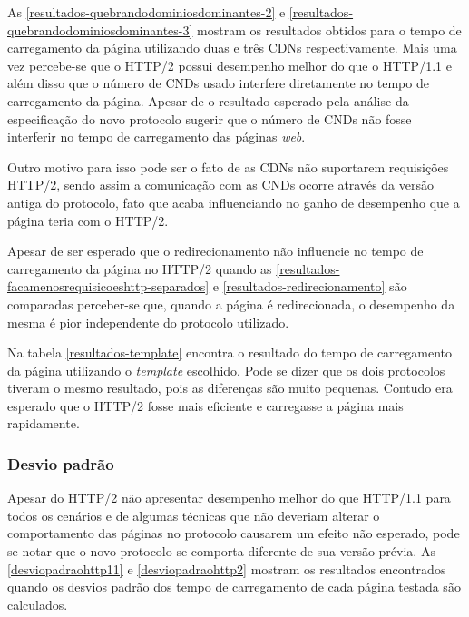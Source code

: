 



As \autoref{resultados-quebrandodominiosdominantes-2} e \autoref{resultados-quebrandodominiosdominantes-3} mostram os resultados obtidos para o tempo de carregamento da página utilizando duas e três CDNs respectivamente. Mais uma vez percebe-se que o HTTP/2 possui desempenho melhor do que o HTTP/1.1 e além disso que o número de CNDs usado interfere diretamente no tempo de carregamento da página. Apesar de o resultado esperado pela análise da especificação do novo protocolo sugerir que o número de CNDs não fosse interferir no tempo de carregamento das páginas \textit{web}.

Outro motivo para isso pode ser o fato de as CDNs não suportarem requisições HTTP/2, sendo assim a comunicação com as CNDs ocorre através da versão antiga do protocolo, fato que acaba influenciando no ganho de desempenho que a página teria com o HTTP/2.



Apesar de ser esperado que o redirecionamento não influencie no tempo de carregamento da página no HTTP/2 quando as \autoref{resultados-facamenosrequisicoeshttp-separados} e \autoref{resultados-redirecionamento} são comparadas perceber-se que, quando a página é redirecionada, o desempenho da mesma é pior independente do protocolo utilizado.



Na tabela \autoref{resultados-template} encontra o resultado do tempo de carregamento da página utilizando o \textit{template} escolhido. Pode se dizer que os dois protocolos tiveram o mesmo resultado, pois as diferenças são muito pequenas. Contudo era esperado que o HTTP/2 fosse mais eficiente e carregasse a página mais rapidamente.

\subsubsection{Desvio padrão}
\label{desviopadrao}

Apesar do HTTP/2 não apresentar desempenho melhor do que HTTP/1.1 para todos os cenários e de algumas técnicas que não deveriam alterar o comportamento das páginas no protocolo causarem um efeito não esperado, pode se notar que o novo protocolo se comporta diferente de sua versão prévia. As \autoref{desviopadraohttp11} e \autoref{desviopadraohttp2} mostram os resultados encontrados quando os desvios padrão dos tempo de carregamento de cada página testada são calculados.


